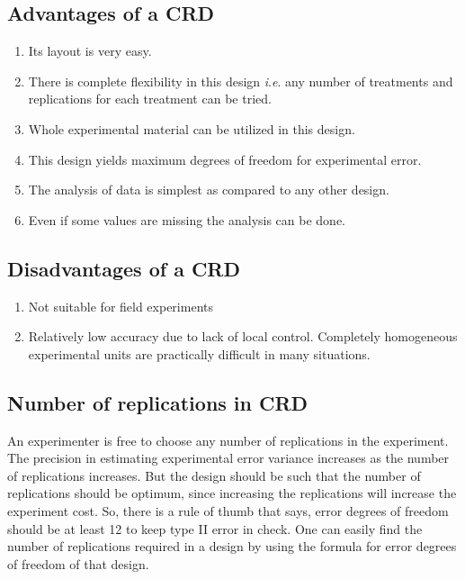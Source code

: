 \documentclass[
]{book}
\begin{document}
\hypertarget{advantages-of-a-crd}{%
\subsection{Advantages of a CRD}\label{advantages-of-a-crd}}

\begin{enumerate}
\def\labelenumi{\arabic{enumi}.}
\item
  Its layout is very easy.
\item
  There is complete flexibility in this design \emph{i}.\emph{e}. any number of
  treatments and replications for each treatment can be tried.
\item
  Whole experimental material can be utilized in this design.
\item
  This design yields maximum degrees of freedom for experimental
  error.
\item
  The analysis of data is simplest as compared to any other design.
\item
  Even if some values are missing the analysis can be done.
\end{enumerate}

\hypertarget{disadvantages-of-a-crd}{%
\subsection{Disadvantages of a CRD}\label{disadvantages-of-a-crd}}

\begin{enumerate}
\def\labelenumi{\arabic{enumi}.}
\item
  Not suitable for field experiments
\item
  Relatively low accuracy due to lack of local control. Completely homogeneous experimental units are practically difficult in many situations.
\end{enumerate}

\hypertarget{replical}{%
\subsection{Number of replications in CRD}\label{replical}}

An experimenter is free to choose any number of replications in the experiment. The precision in estimating experimental error variance increases as the number of replications increases. But the design should be such that the number of replications should be optimum, since increasing the replications will increase the experiment cost. So, there
is a rule of thumb that says, error degrees of freedom should be at least 12 to keep type II error in check. One can easily find the number of replications required in a design by using the formula for error degrees of freedom of that design.
\end{document}
